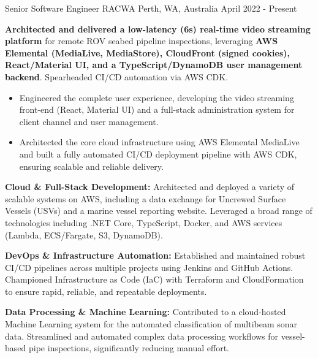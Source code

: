 

\begin{cventries}

  \cventry
    {Senior Software Engineer} %
    {RACWA} %
    {Perth, WA, Australia} %
    {April 2022 - Present} %
    {
      \begin{cvitems} %
        \item {\textbf{Architected and delivered a low-latency (6s) real-time video streaming platform} for remote ROV seabed pipeline inspections, leveraging \textbf{AWS Elemental (MediaLive, MediaStore), CloudFront (signed cookies), React/Material UI, and a TypeScript/DynamoDB user management backend}. Spearheaded CI/CD automation via AWS CDK.}
          \begin{itemize}
            \item {Engineered the complete user experience, developing the video streaming front-end (React, Material UI) and a full-stack administration system for client channel and user management.}
            \item {Architected the core cloud infrastructure using AWS Elemental MediaLive and built a fully automated CI/CD deployment pipeline with AWS CDK, ensuring scalable and reliable delivery.}
          \end{itemize}
        \item {\textbf{Cloud \& Full-Stack Development:} Architected and deployed a variety of scalable systems on AWS, including a data exchange for Uncrewed Surface Vessels (USVs) and a marine vessel reporting website. Leveraged a broad range of technologies including .NET Core, TypeScript, Docker, and AWS services (Lambda, ECS/Fargate, S3, DynamoDB).}
        \item {\textbf{DevOps \& Infrastructure Automation:} Established and maintained robust CI/CD pipelines across multiple projects using Jenkins and GitHub Actions. Championed Infrastructure as Code (IaC) with Terraform and CloudFormation to ensure rapid, reliable, and repeatable deployments.}
        \item {\textbf{Data Processing \& Machine Learning:} Contributed to a cloud-hosted Machine Learning system for the automated classification of multibeam sonar data. Streamlined and automated complex data processing workflows for vessel-based pipe inspections, significantly reducing manual effort.}

\end{cvitems}}
\end{cventries}
